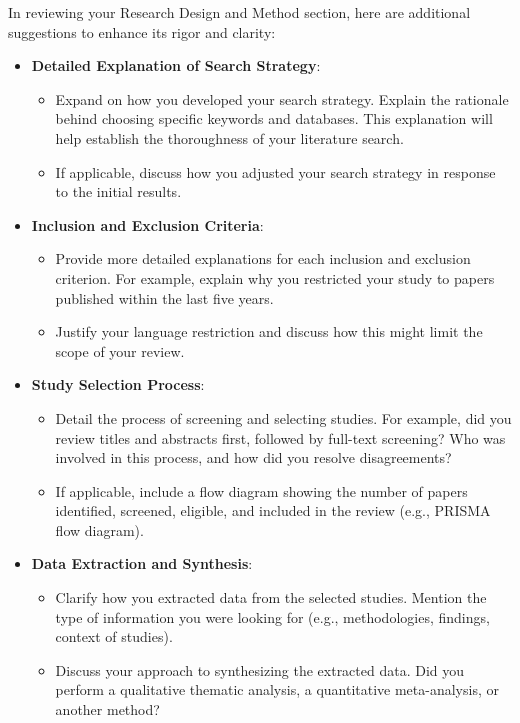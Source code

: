 \documentclass[conference]{IEEEtran}
\begin{document}
{\color{red}In reviewing your Research Design and Method section, here are additional suggestions to enhance its rigor and clarity:
    \begin{itemize}
        \item \textbf{Detailed Explanation of Search Strategy}:
              \begin{itemize}
                  \item Expand on how you developed your search strategy. Explain the rationale behind choosing specific keywords and databases. This explanation will help establish the thoroughness of your literature search.
                  \item If applicable, discuss how you adjusted your search strategy in response to the initial results.
              \end{itemize}

        \item \textbf{Inclusion and Exclusion Criteria}:
              \begin{itemize}
                  \item Provide more detailed explanations for each inclusion and exclusion criterion. For example, explain why you restricted your study to papers published within the last five years.
                  \item Justify your language restriction and discuss how this might limit the scope of your review.
              \end{itemize}

        \item \textbf{Study Selection Process}:
              \begin{itemize}
                  \item Detail the process of screening and selecting studies. For example, did you review titles and abstracts first, followed by full-text screening? Who was involved in this process, and how did you resolve disagreements?
                  \item If applicable, include a flow diagram showing the number of papers identified, screened, eligible, and included in the review (e.g., PRISMA flow diagram).
              \end{itemize}

        \item \textbf{Data Extraction and Synthesis}:
              \begin{itemize}
                  \item Clarify how you extracted data from the selected studies. Mention the type of information you were looking for (e.g., methodologies, findings, context of studies).
                  \item Discuss your approach to synthesizing the extracted data. Did you perform a qualitative thematic analysis, a quantitative meta-analysis, or another method?
              \end{itemize}


\end{itemize}}
\end{document}
